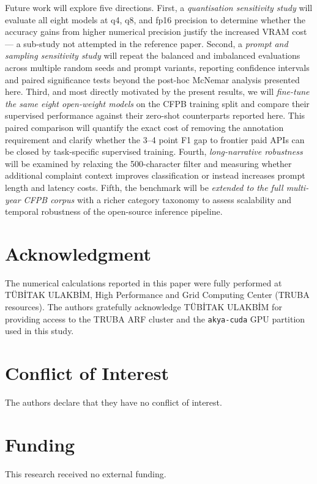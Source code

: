 \documentclass[journal]{IEEEtran}
\begin{document}
Future work will explore five directions.
First, a \emph{quantisation sensitivity study} will evaluate all eight
models at q4, q8, and fp16 precision to determine whether the accuracy
gains from higher numerical precision justify the increased VRAM cost — a
sub-study not attempted in the reference paper.
Second, a \emph{prompt and sampling sensitivity study} will repeat the
balanced and imbalanced evaluations across multiple random seeds and
prompt variants, reporting confidence intervals and paired significance
tests beyond the post-hoc McNemar analysis presented here.
Third, and most directly motivated by the present results, we will
\emph{fine-tune the same eight open-weight models} on the CFPB
training split and compare their supervised performance against their
zero-shot counterparts reported here. This paired comparison will
quantify the exact cost of removing the annotation requirement and
clarify whether the 3–4 point F1 gap to frontier paid APIs can be
closed by task-specific supervised training.
Fourth, \emph{long-narrative robustness} will be examined by relaxing
the 500-character filter and measuring whether additional complaint
context improves classification or instead increases prompt length and
latency costs.
Fifth, the benchmark will be \emph{extended to the full multi-year
CFPB corpus} with a richer category taxonomy to assess scalability
and temporal robustness of the open-source inference pipeline.

\section*{Acknowledgment}
The numerical calculations reported in this paper were fully performed
at T{\"U}B\.{I}TAK ULAKB\.{I}M, High Performance and Grid Computing
Center (TRUBA resources). The authors gratefully acknowledge
T{\"U}B\.{I}TAK ULAKB\.{I}M for providing access to the TRUBA ARF
cluster and the \texttt{akya-cuda} GPU partition used in this study.

\section*{Conflict of Interest}
The authors declare that they have no conflict of interest.

\section*{Funding}
This research received no external funding.
\end{document}

